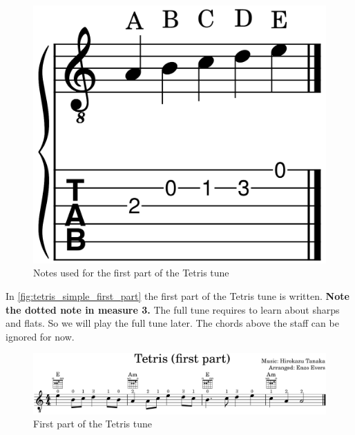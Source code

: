 \begin{figure}[h]
	\centering
	\includegraphics[height=0.12\textheight]{../../MuseScore/Guitar/NotesUsedInTetris_FirstPart.png}
	\caption{Notes used for the first part of the Tetris tune}
	\label{fig:notes_for_tetris_first_part}
\end{figure}

In \autoref{fig:tetris_simple_first_part} the first part of the Tetris tune is written. \textbf{Note the dotted note in measure 3.} The full tune requires to learn about sharps and flats. So we will play the full tune later. The chords above the staff can be ignored for now.

\begin{figure}[h]
	\centering
	\includegraphics[width=\textwidth]{../../MuseScore/Guitar/GuitarTetrisFirstPart.png}
	\caption{First part of the Tetris tune}
	\label{fig:tetris_simple_first_part}
\end{figure}


